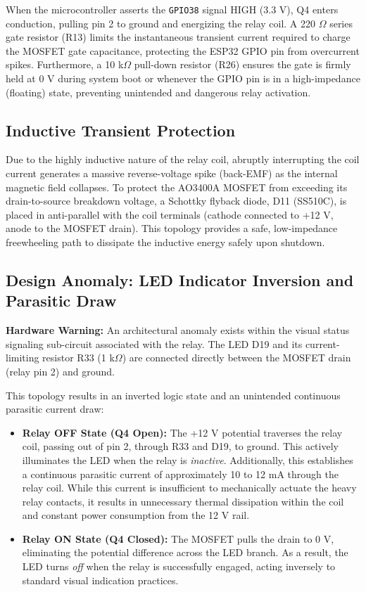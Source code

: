 \documentclass[11pt,a4paper]{article}
\begin{document}
When the microcontroller asserts the \texttt{GPIO38} signal HIGH (3.3 V), Q4 enters conduction, pulling pin 2 to ground and energizing the relay coil. A 220 $\Omega$ series gate resistor (R13) limits the instantaneous transient current required to charge the MOSFET gate capacitance, protecting the ESP32 GPIO pin from overcurrent spikes. Furthermore, a 10 k$\Omega$ pull-down resistor (R26) ensures the gate is firmly held at 0 V during system boot or whenever the GPIO pin is in a high-impedance (floating) state, preventing unintended and dangerous relay activation.

\subsection{Inductive Transient Protection}
Due to the highly inductive nature of the relay coil, abruptly interrupting the coil current generates a massive reverse-voltage spike (back-EMF) as the internal magnetic field collapses. To protect the AO3400A MOSFET from exceeding its drain-to-source breakdown voltage, a Schottky flyback diode, D11 (SS510C), is placed in anti-parallel with the coil terminals (cathode connected to +12 V, anode to the MOSFET drain). This topology provides a safe, low-impedance freewheeling path to dissipate the inductive energy safely upon shutdown.

\subsection{Design Anomaly: LED Indicator Inversion and Parasitic Draw}
\textbf{Hardware Warning:} An architectural anomaly exists within the visual status signaling sub-circuit associated with the relay. The LED D19 and its current-limiting resistor R33 (1 k$\Omega$) are connected directly between the MOSFET drain (relay pin 2) and ground.

This topology results in an inverted logic state and an unintended continuous parasitic current draw:
\begin{itemize}
    \item \textbf{Relay OFF State (Q4 Open):} The +12 V potential traverses the relay coil, passing out of pin 2, through R33 and D19, to ground. This actively illuminates the LED when the relay is \textit{inactive}. Additionally, this establishes a continuous parasitic current of approximately 10 to 12 mA through the relay coil. While this current is insufficient to mechanically actuate the heavy relay contacts, it results in unnecessary thermal dissipation within the coil and constant power consumption from the 12 V rail.
    \item \textbf{Relay ON State (Q4 Closed):} The MOSFET pulls the drain to 0 V, eliminating the potential difference across the LED branch. As a result, the LED turns \textit{off} when the relay is successfully engaged, acting inversely to standard visual indication practices.
\end{itemize}
\end{document}
